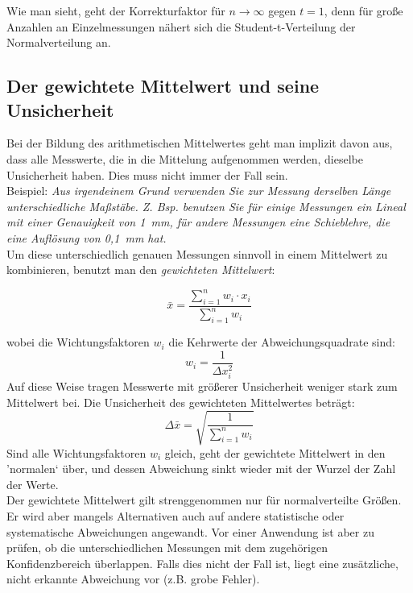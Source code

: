 Wie man sieht, geht der Korrekturfaktor für $n\rightarrow\infty$ gegen $t=1$, denn für große Anzahlen an Einzelmessungen nähert sich die Student-t-Verteilung der Normalverteilung an.

\subsection{Der gewichtete Mittelwert und seine Unsicherheit}

Bei der Bildung des arithmetischen Mittelwertes geht man implizit davon aus, dass alle Messwerte, die in die Mittelung aufgenommen werden, dieselbe Unsicherheit haben. Dies muss nicht immer der Fall sein.\\

Beispiel: \textit{Aus irgendeinem Grund verwenden Sie zur Messung derselben Länge unterschiedliche Maßstäbe. Z. Bsp. benutzen Sie für einige Messungen ein Lineal mit einer Genauigkeit von 1~mm, für andere Messungen eine Schieblehre, die eine Auflösung von 0,1~mm hat.}\\

Um diese unterschiedlich genauen Messungen sinnvoll in einem Mittelwert zu kombinieren, benutzt man den \textit{gewichteten Mittelwert}:
\begin{hint}
	\begin{equation}
		\bar{x} = \frac{\sum_{i=1}^n{w_i\cdot x_i}}{\sum_{i=1}^n{w_i}}
	\end{equation}
\end{hint}
wobei die Wichtungsfaktoren $w_i$ die Kehrwerte der Abweichungsquadrate sind:
\begin{equation*}
	w_i = \frac{1}{\Delta x_i^2}
\end{equation*}
Auf diese Weise tragen Messwerte mit größerer Unsicherheit weniger stark zum Mittelwert bei. Die Unsicherheit des gewichteten Mittelwertes beträgt:
\begin{equation}
	\Delta\bar{x} = \sqrt{\frac{1}{\sum_{i=1}^n{w_i}}}
\end{equation}
Sind alle Wichtungsfaktoren $w_i$ gleich, geht der gewichtete Mittelwert in den 'normalen` über, und dessen Abweichung sinkt wieder mit der Wurzel der Zahl der Werte.\\

Der gewichtete Mittelwert gilt strenggenommen nur für normalverteilte Größen. Er wird aber mangels Alternativen auch auf andere statistische oder systematische Abweichungen angewandt. Vor einer Anwendung ist aber zu prüfen, ob die unterschiedlichen Messungen mit dem zugehörigen Konfidenzbereich überlappen. Falls dies nicht der Fall ist, liegt eine zusätzliche, nicht erkannte Abweichung vor (z.B. grobe Fehler).\\

